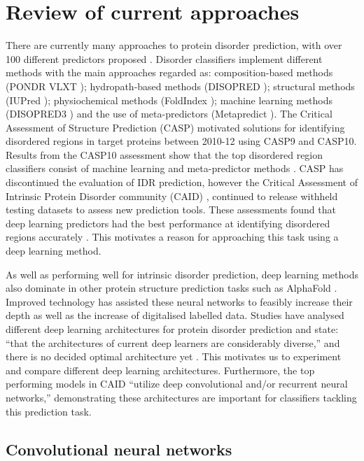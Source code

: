 \documentclass{l4proj}
\begin{document}
\section{Review of current approaches}
\label{sec:current approaches}

There are currently many approaches to protein disorder prediction, with over 100 different predictors proposed \citep{Zhao:22}. Disorder classifiers implement different methods with the main approaches regarded as: composition-based methods (PONDR VLXT \citep{Romero:01}); hydropath-based methods (DISOPRED \citep{Ward:04}); structural methods (IUPred \citep{Dosztanyi:18}); physiochemical methods (FoldIndex \citep{Prilusky:05}); machine learning methods (DISOPRED3 \citep{Jones:15}) and the use of meta-predictors (Metapredict \citep{Emenecker:21}). The Critical Assessment of Structure Prediction (CASP) \citep{casp} motivated solutions for identifying disordered regions in target proteins between 2010-12 using CASP9 and CASP10. Results from the CASP10 assessment \citep{Moult:14} show that the top disordered region classifiers consist of machine learning and meta-predictor methods \citep{Zhao:22}. CASP has discontinued the evaluation of IDR prediction, however the Critical Assessment of Intrinsic Protein Disorder community (CAID) \citep{Necci:21}, continued to release withheld testing datasets to assess new prediction tools. These assessments found that deep learning predictors had the best performance at identifying disordered regions accurately \citep{Zhao:22}. This motivates a reason for approaching this task using a deep learning method.

As well as performing well for intrinsic disorder prediction, deep learning methods also dominate in other protein structure prediction tasks such as AlphaFold \citep{Jumper:21}. Improved technology has assisted these neural networks to feasibly increase their depth as well as the increase of digitalised labelled data. Studies have analysed different deep learning architectures for protein disorder prediction and state: “that the architectures of current deep learners are considerably diverse,” and there is no decided optimal architecture yet \citep{Zhao:22}. This motivates us to experiment and compare different deep learning architectures. Furthermore, the top performing models in CAID “utilize deep convolutional and/or recurrent neural networks,” \citep{Hu:21} demonstrating these architectures are important for classifiers tackling this prediction task.

\subsection{Convolutional neural networks}
\label{chap:background sec:litrevCNN}
\end{document}
